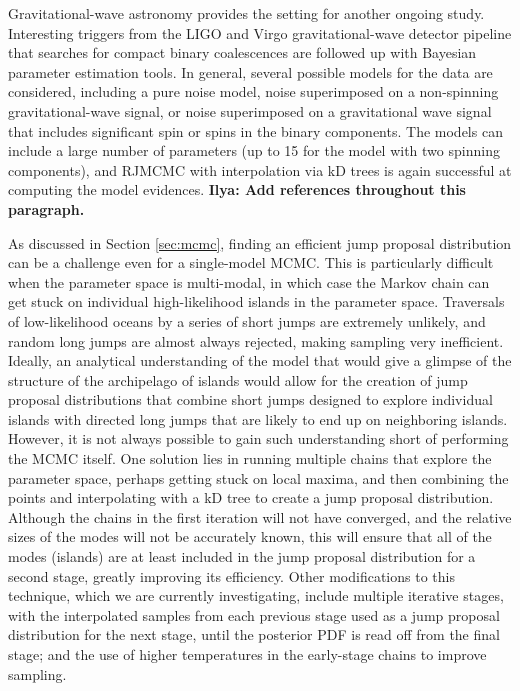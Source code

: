 \documentclass[prd,preprint]{revtex4}
\newcommand{\ilya}[1]{{\color{red} \bf Ilya: #1}}
\begin{document}
Gravitational-wave astronomy provides the setting for another ongoing
study.  Interesting triggers from the LIGO and Virgo
gravitational-wave detector pipeline that searches for compact binary
coalescences are followed up with Bayesian parameter estimation tools.
In general, several possible models for the data are considered,
including a pure noise model, noise superimposed on a non-spinning
gravitational-wave signal, or noise superimposed on a gravitational
wave signal that includes significant spin or spins in the binary
components.  The models can include a large number of parameters (up
to 15 for the model with two spinning components), and RJMCMC with
interpolation via kD trees is again successful at computing the model
evidences. \ilya{Add references throughout this paragraph.}

As discussed in Section \ref{sec:mcmc}, finding an efficient jump proposal distribution can be a challenge even for a single-model MCMC.  This is particularly difficult when the parameter space is multi-modal, in which case the Markov chain can get stuck on individual high-likelihood islands in the parameter space.  Traversals of low-likelihood oceans by a series of short jumps are extremely unlikely, and random long jumps are almost always rejected, making sampling very inefficient.  Ideally, an analytical understanding of the model that would give a glimpse of the structure of the archipelago of islands would allow for the creation of jump proposal distributions that combine short jumps designed to explore individual islands with directed long jumps that are likely to end up on neighboring islands.  However, it is not always possible to gain such understanding short of performing the MCMC itself.  One solution lies in running multiple chains that explore the parameter space, perhaps getting stuck on local maxima, and then combining the points and interpolating with a kD tree to create a jump proposal distribution.  Although the chains in the first iteration will not have converged, and the relative sizes of the modes will not be accurately known, this will ensure that all of the modes (islands) are at least included in the jump proposal distribution for a second stage, greatly improving its efficiency.  Other modifications to this technique, which we are currently investigating, include multiple iterative stages, with the interpolated samples from each previous stage used as a jump proposal distribution for the next stage, until the posterior PDF is read off from the final stage; and the use of higher temperatures in the early-stage chains to improve sampling.
\end{document}
